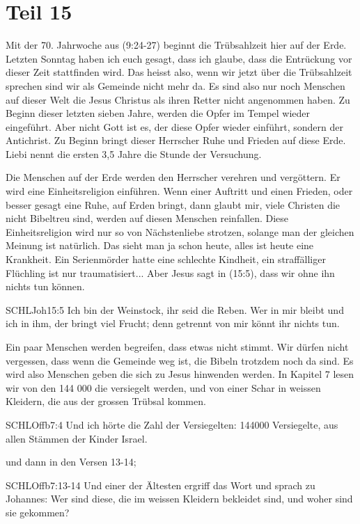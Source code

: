 \section{Teil 15}
\begin{otsblock}
        Mit der 70. Jahrwoche aus (9:24-27) beginnt die Trübsahlzeit hier auf der Erde. Letzten Sonntag haben ich euch gesagt, dass ich glaube, dass die Entrückung vor dieser Zeit stattfinden wird. Das heisst also, wenn wir jetzt über die Trübsahlzeit sprechen sind wir als Gemeinde nicht mehr da. Es sind also nur noch Menschen auf dieser Welt die Jesus Christus als ihren Retter nicht angenommen haben. Zu Beginn dieser letzten sieben Jahre, werden die Opfer im Tempel wieder eingeführt. Aber nicht Gott ist es, der diese Opfer wieder einführt, sondern der Antichrist. Zu Beginn bringt dieser Herrscher Ruhe und Frieden auf diese Erde. Liebi nennt die ersten 3,5 Jahre die Stunde der Versuchung. 
        
        Die Menschen auf der Erde werden den Herrscher verehren und vergöttern. Er wird eine Einheitsreligion einführen. Wenn einer Auftritt und einen Frieden, oder besser gesagt eine Ruhe, auf Erden bringt, dann glaubt mir, viele  Christen die nicht Bibeltreu sind, werden auf diesen Menschen reinfallen. Diese Einheitsreligion wird nur so von Nächstenliebe strotzen, solange man der gleichen Meinung ist natürlich. Das sieht man ja schon heute, alles ist heute eine Krankheit. Ein Serienmörder hatte eine schlechte Kindheit, ein straffälliger Flüchling ist nur traumatisiert... Aber Jesus sagt in (15:5), dass wir ohne ihn nichts tun können. 
        \begin{bibelbox}{SCHL}{Joh}{15:5}
            Ich bin der Weinstock, ihr seid die Reben. Wer in mir bleibt und ich in ihm, der bringt viel Frucht; denn getrennt von mir könnt ihr nichts tun.
        \end{bibelbox}
        Ein paar Menschen werden begreifen, dass etwas nicht stimmt. Wir dürfen nicht vergessen, dass wenn die Gemeinde weg ist, die Bibeln trotzdem noch da sind. Es wird also Menschen geben die sich zu Jesus hinwenden werden. In Kapitel 7 lesen wir von den 144 000 die versiegelt werden, und von einer Schar in weissen Kleidern, die aus der grossen Trübsal kommen. 
        \begin{bibelbox}{SCHL}{Offb}{7:4}
            Und ich hörte die Zahl der Versiegelten: 144000 Versiegelte, aus allen Stämmen der Kinder Israel.
        \end{bibelbox}
        und dann in den Versen 13-14;
        \begin{bibelbox}{SCHL}{Offb}{7:13-14}
            Und einer der Ältesten ergriff das Wort und sprach zu Johannes: Wer sind diese, die im weissen Kleidern bekleidet sind, und woher sind sie gekommen?


\end{bibelbox}
\end{otsblock}
